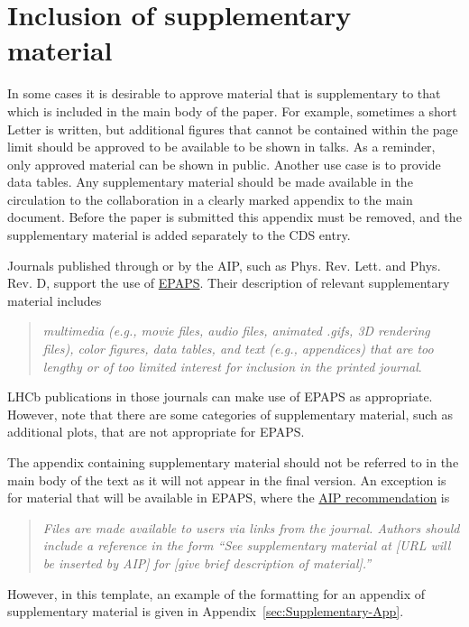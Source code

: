 \section{Inclusion of supplementary material}
\label{sec:Supplementary}

In some cases it is desirable to approve material that is
supplementary to that which is included in the main body of the paper.
For example, sometimes a short Letter is written, but additional
figures that cannot be contained within the page limit should be
approved to be available to be shown in talks. As a reminder, only
approved material can be shown in public. Another use case is to
provide data tables.  Any supplementary material should be made
available in the circulation to the collaboration in a clearly marked
appendix to the main document.  Before the paper is submitted this
appendix must be removed, and the supplementary material is added
separately to the CDS entry.

Journals published through or by the AIP, such as Phys. Rev. Lett. and
Phys. Rev. D, support the use of
\href{http://www.aip.org/pubservs/epaps.html}{EPAPS}.  Their
description of relevant supplementary material includes
\begin{quote} {\it multimedia (e.g., movie files, audio files,
    animated .gifs, 3D rendering files), color figures, data tables,
    and text (e.g., appendices) that are too lengthy or of too limited
    interest for inclusion in the printed journal}.
\end{quote}
LHCb publications in those journals can make use of EPAPS as appropriate.
However, note that there are some categories of supplementary
material, such as additional plots, that are not appropriate for
EPAPS.

The appendix containing supplementary material should not be
referred to in the main body of the text as it will not appear in
the final version.  An exception is for material that will be
available in EPAPS, where the
\href{http://www.aip.org/epaps/how_epaps_works.html#deposit}{AIP
  recommendation} is
\begin{quote} {\it Files are made available to users via links from
    the journal. Authors should include a reference in the form ``See
    supplementary material at [URL will be inserted by AIP] for [give
    brief description of material].''}
\end{quote}
However, in this template, an example of the formatting for an appendix
of supplementary material is given in
Appendix~\ref{sec:Supplementary-App}.

